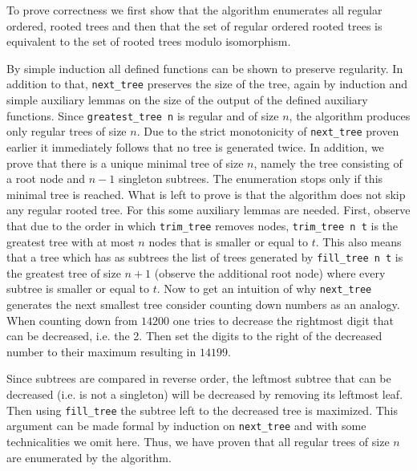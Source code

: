 To prove correctness we first show that the algorithm enumerates all regular ordered, rooted trees and then that the set of regular ordered rooted trees is equivalent to the set of rooted trees modulo isomorphism.

By simple induction all defined functions can be shown to preserve regularity. In addition to that, \texttt{next\_tree} preserves the size of the tree, again by induction and simple auxiliary lemmas on the size of the output of the defined auxiliary functions.
Since \mbox{\texttt{greatest\_tree n}} is regular and of size $n$, the algorithm produces only regular trees of size $n$.
Due to the strict monotonicity of \texttt{next\_tree} proven earlier it immediately follows that no tree is generated twice.
In addition, we prove that there is a unique minimal tree of size $n$, namely the tree consisting of a root node and $n-1$ singleton subtrees.
The enumeration stops only if this minimal tree is reached.
What is left to prove is that the algorithm does not skip any regular rooted tree.
For this some auxiliary lemmas are needed.
First, observe that due to the order in which \texttt{trim\_tree} removes nodes, \texttt{trim\_tree n t} is the greatest tree with at most $n$ nodes that is smaller or equal to $t$.
This also means that a tree which has as subtrees the list of trees generated by \texttt{fill\_tree\ n\ t} is the greatest tree of size $n + 1$ (observe the additional root node) where every subtree is smaller or equal to $t$.
Now to get an intuition of why \texttt{next\_tree} generates the next smallest tree consider counting down numbers as an analogy.
When counting down from $14200$ one tries to decrease the rightmost digit that can be decreased, i.e. the 2.
Then set the digits to the right of the decreased number to their maximum resulting in $14199$.

Since subtrees are compared in reverse order, the leftmost subtree that can be decreased (i.e. is not a singleton) will be decreased by removing its leftmost leaf.
Then using \texttt{fill\_tree} the subtree left to the decreased tree is maximized.
This argument can be made formal by induction on \texttt{next\_tree} and with some technicalities we omit here.
Thus, we have proven that all regular trees of size $n$ are enumerated by the algorithm.

